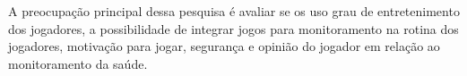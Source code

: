 A preocupação principal dessa pesquisa  é avaliar se os uso grau de entretenimento dos jogadores, a possibilidade de integrar jogos para monitoramento na rotina dos jogadores, motivação para jogar, segurança e opinião do jogador em relação ao monitoramento da saúde.
%

